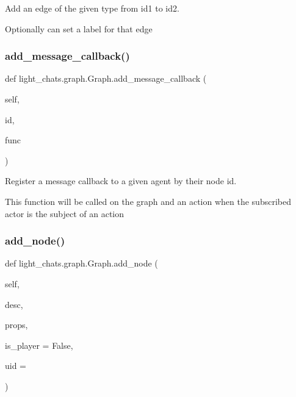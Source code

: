 \begin{DoxyVerb}Add an edge of the given type from id1 to id2.

Optionally can set a label for that edge
\end{DoxyVerb}
 \mbox{\label{classlight__chats_1_1graph_1_1Graph_ad445b8282327b777a3419b2a5309237a}} 
\subsubsection{\texorpdfstring{add\+\_\+message\+\_\+callback()}{add\_message\_callback()}}
{\footnotesize\ttfamily def light\+\_\+chats.\+graph.\+Graph.\+add\+\_\+message\+\_\+callback (\begin{DoxyParamCaption}\item[{}]{self,  }\item[{}]{id,  }\item[{}]{func }\end{DoxyParamCaption})}

\begin{DoxyVerb}Register a message callback to a given agent by their node id.

This function will be called on the graph and an action when the subscribed
actor is the subject of an action
\end{DoxyVerb}
 \mbox{\label{classlight__chats_1_1graph_1_1Graph_a5356cdaf2e48b3a128773c70957cb38a}} 
\subsubsection{\texorpdfstring{add\+\_\+node()}{add\_node()}}
{\footnotesize\ttfamily def light\+\_\+chats.\+graph.\+Graph.\+add\+\_\+node (\begin{DoxyParamCaption}\item[{}]{self,  }\item[{}]{desc,  }\item[{}]{props,  }\item[{}]{is\+\_\+player = {\ttfamily False},  }\item[{}]{uid = {\ttfamily \textquotesingle{}\textquotesingle{}} }\end{DoxyParamCaption})}

